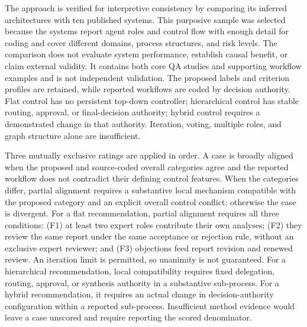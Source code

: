 \documentclass[a4paper,fleqn]{cas-dc}
\begin{document}
The approach is verified for interpretive consistency by comparing its
inferred architectures with ten published systems. This purposive sample was
selected because the systems report agent roles and control flow with enough
detail for coding and cover different domains, process structures, and risk
levels. The comparison does not evaluate system performance, establish causal
benefit, or claim external validity. It contains both core QA studies and
supporting workflow examples and is not independent validation. The proposed
labels and criterion profiles are retained, while reported workflows are
coded by decision authority.
Flat control has no persistent top-down controller; hierarchical control has
stable routing, approval, or final-decision authority; hybrid control requires
a demonstrated change in that authority. Iteration, voting, multiple roles,
and graph structure alone are insufficient.

Three mutually exclusive ratings are applied in order. A case is broadly
aligned when the proposed and source-coded overall categories agree and the
reported workflow does not contradict their defining control features.
When the categories differ, partial alignment requires a substantive local
mechanism compatible with the proposed category and an explicit overall
control conflict; otherwise the case is divergent. For a flat recommendation,
partial alignment requires all three conditions: (F1) at least two expert
roles contribute their own analyses; (F2) they review the same report under
the same acceptance or rejection rule, without an exclusive expert reviewer;
and (F3) objections feed report revision and renewed review. An iteration
limit is permitted, so unanimity is not guaranteed. For a hierarchical
recommendation, local compatibility requires fixed delegation, routing,
approval, or synthesis authority in a substantive sub-process. For a hybrid
recommendation, it requires an actual change in decision-authority
configuration within a reported sub-process. Insufficient method evidence
would leave a case unscored and require reporting the scored denominator.
\end{document}
